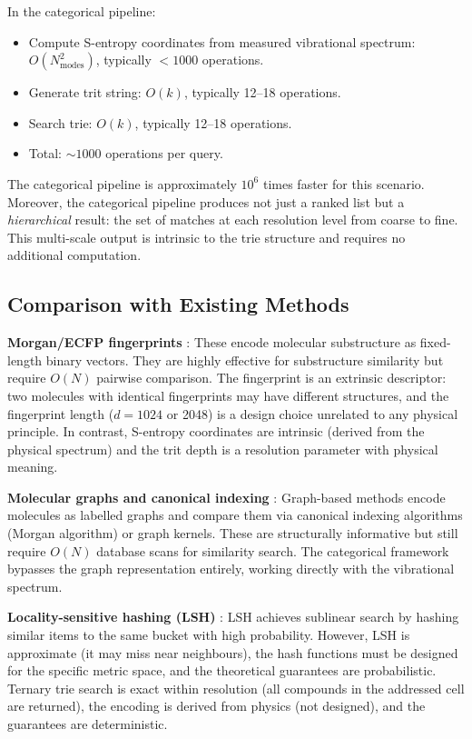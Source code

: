 \documentclass[11pt,a4paper]{article}
\theoremstyle{definition}
\theoremstyle{remark}
\begin{document}
In the categorical pipeline:

\begin{itemize}[nosep]
\item Compute S-entropy coordinates from measured vibrational spectrum: $O(N_{\mathrm{modes}}^2)$, typically $< 1000$ operations.
\item Generate trit string: $O(k)$, typically 12--18 operations.
\item Search trie: $O(k)$, typically 12--18 operations.
\item Total: $\sim 1000$ operations per query.
\end{itemize}

The categorical pipeline is approximately $10^6$ times faster for this scenario. Moreover, the categorical pipeline produces not just a ranked list but a \emph{hierarchical} result: the set of matches at each resolution level from coarse to fine. This multi-scale output is intrinsic to the trie structure and requires no additional computation.

\subsection{Comparison with Existing Methods}

\textbf{Morgan/ECFP fingerprints} \citep{rogers2010}: These encode molecular substructure as fixed-length binary vectors. They are highly effective for substructure similarity but require $O(N)$ pairwise comparison. The fingerprint is an extrinsic descriptor: two molecules with identical fingerprints may have different structures, and the fingerprint length ($d = 1024$ or 2048) is a design choice unrelated to any physical principle. In contrast, S-entropy coordinates are intrinsic (derived from the physical spectrum) and the trit depth is a resolution parameter with physical meaning.

\textbf{Molecular graphs and canonical indexing} \citep{morgan1965}: Graph-based methods encode molecules as labelled graphs and compare them via canonical indexing algorithms (Morgan algorithm) or graph kernels. These are structurally informative but still require $O(N)$ database scans for similarity search. The categorical framework bypasses the graph representation entirely, working directly with the vibrational spectrum.

\textbf{Locality-sensitive hashing (LSH)} \citep{indyk1998}: LSH achieves sublinear search by hashing similar items to the same bucket with high probability. However, LSH is approximate (it may miss near neighbours), the hash functions must be designed for the specific metric space, and the theoretical guarantees are probabilistic. Ternary trie search is exact within resolution (all compounds in the addressed cell are returned), the encoding is derived from physics (not designed), and the guarantees are deterministic.
\end{document}
